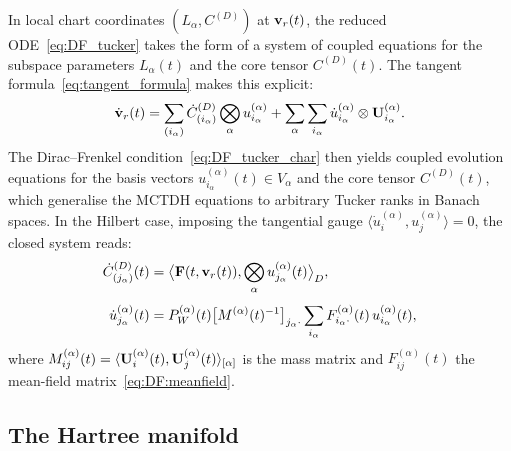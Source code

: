 \begin{remark}
\label{rem:kinematic}
In local chart coordinates $(L_\alpha, C^{(D)})$ at $\mathbf{v}_r(t)$,
the reduced ODE~\eqref{eq:DF_tucker} takes the form of a system
of coupled equations for the subspace parameters $L_\alpha(t)$ and
the core tensor $C^{(D)}(t)$. The tangent formula~\eqref{eq:tangent_formula}
makes this explicit:
\begin{equation*}
    \dot{\mathbf{v}}_r(t)
    = \sum_{(i_\alpha)} \dot{C}^{(D)}_{(i_\alpha)} \bigotimes_\alpha u^{(\alpha)}_{i_\alpha}
    + \sum_\alpha \sum_{i_\alpha} \dot{u}^{(\alpha)}_{i_\alpha}
      \otimes \mathbf{U}^{(\alpha)}_{i_\alpha}.
\end{equation*}
The Dirac--Frenkel condition~\eqref{eq:DF_tucker_char} then yields
coupled evolution equations for the basis vectors
$u^{(\alpha)}_{i_\alpha}(t) \in V_\alpha$ and the core tensor
$C^{(D)}(t)$, which generalise the MCTDH equations to arbitrary
Tucker ranks in Banach spaces. In the Hilbert case, imposing the
tangential gauge $\langle \dot{u}^{(\alpha)}_i, u^{(\alpha)}_j\rangle = 0$,
the closed system reads:
\begin{subequations}
\label{eq:DF:MCTDH}
\begin{align}
    \dot{C}^{(D)}_{(j_\alpha)}(t)
    &= \bigl\langle \mathbf{F}(t,\mathbf{v}_r(t)),
       \bigotimes_\alpha u^{(\alpha)}_{j_\alpha}(t)\bigr\rangle_D,
    \label{eq:DF:MCTDH_core}\\[4pt]
    \dot{u}^{(\alpha)}_{j_\alpha}(t)
    &= P^{(\alpha)}_W(t)
       \bigl[M^{(\alpha)}(t)^{-1}\bigr]_{j_\alpha \cdot}
       \sum_{i_\alpha} F^{(\alpha)}_{i_\alpha \cdot}(t)\,
       u^{(\alpha)}_{i_\alpha}(t),
    \label{eq:DF:MCTDH_basis}
\end{align}
\end{subequations}
where $M^{(\alpha)}_{ij}(t) = \langle \mathbf{U}^{(\alpha)}_i(t),
\mathbf{U}^{(\alpha)}_j(t)\rangle_{[\alpha]}$ is the mass matrix and
$F^{(\alpha)}_{ij}(t)$ the mean-field matrix~\eqref{eq:DF:meanfield}.
\end{remark}

\subsection*{The Hartree manifold}

